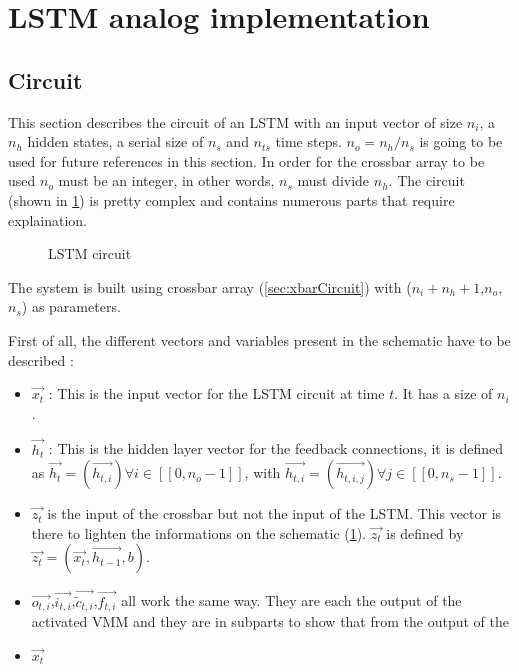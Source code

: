 \section{\ac{LSTM} analog implementation}\label{sec:lstmCircuit}

\subsection{Circuit}

This section describes the circuit of an \ac{LSTM} with an input vector of size $n_i$, a $n_h$ hidden states, a serial size of $n_s$ and $n_{ts}$ time steps. $n_o=n_h/n_s$ is going to be used for future references in this section. In order for the crossbar array to be used $n_o$ must be an integer, in other words, $n_s$ must divide $n_h$. The circuit (shown in \cref{circt:lstm}) is pretty complex and contains numerous parts that require explaination.

\begin{figure}[H]
  \centering
  
  \caption{\ac{LSTM} circuit}
  \label{circt:lstm}
\end{figure}

The system is built using crossbar array (\cref{sec:xbarCircuit}) with ($n_i+n_h+1$,$n_o$, $n_s$) as parameters.

First of all, the different vectors and variables present in the schematic have to be described :

\begin{itemize}
  \item $\overrightarrow{x_t}$ : This is the input vector for the \ac{LSTM} circuit at time $t$. It has a size of $n_i$.
  \item $\overrightarrow{h_t}$ : This is the hidden layer vector for the feedback connections, it is defined as $\overrightarrow{h_t}=(\overrightarrow{h_{t,i}}) \forall i\in [\![0,n_o-1]\!]$, with $\overrightarrow{h_{t,i}}=(\overrightarrow{h_{t,i,j}}) \forall j\in [\![0,n_s-1]\!]$.
  \item $\overrightarrow{z_t}$ is the input of the crossbar but not the input of the \ac{LSTM}. This vector is there to lighten the informations on the schematic (\cref{circt:lstm}). $\overrightarrow{z_t}$ is defined by $\overrightarrow{z_t}=(\overrightarrow{x_t},\overrightarrow{h_{t-1}},b)$.
  \item $\overrightarrow{o_{t,i}}$,$\overrightarrow{i_{t,i}}$,$\overrightarrow{\tilde{c}_{t,i}}$,$\overrightarrow{f_{t,i}}$ all work the same way. They are each the output of the activated \ac{VMM} and they are in subparts to show that from the output of the
  \item $\overrightarrow{x_t}$
\end{itemize}

